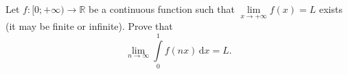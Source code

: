 Let $f:[0;+\infty)\to \mathbb R$ be a continuous function such that $\lim\limits_{x\to +\infty} f(x)=L$ exists (it may be finite or infinite). Prove that $$ \lim\limits_{n\to\infty}\int\limits_0^{1}f(nx)\,\mathrm{d}x=L. $$
